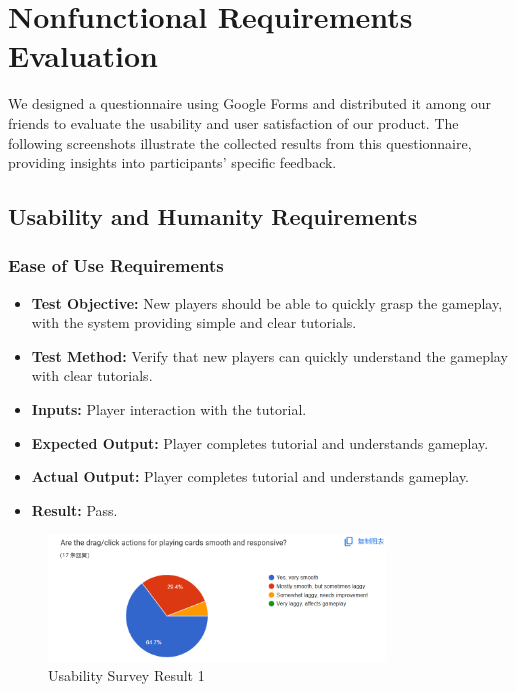 \documentclass[12pt, titlepage]{article}
\begin{document}
\newpage

\section{Nonfunctional Requirements Evaluation}

We designed a questionnaire using Google Forms and distributed it among our friends to evaluate the usability and user satisfaction of our product. The following screenshots illustrate the collected results from this questionnaire, providing insights into participants' specific feedback.

\subsection{Usability and Humanity Requirements}

\subsubsection{Ease of Use Requirements}

\begin{itemize}
    \item \textbf{Test Objective:} New players should be able to quickly grasp the gameplay, with the system providing simple and clear tutorials.
    \item \textbf{Test Method:} Verify that new players can quickly understand the gameplay with clear tutorials.

        \item \textbf{Inputs:} Player interaction with the tutorial.
    \item \textbf{Expected Output:} Player completes tutorial and understands gameplay.
    \item \textbf{Actual Output:} Player completes tutorial and understands gameplay.
    \item \textbf{Result:} Pass.
\end{itemize}

\begin{figure}[h!]
    \centering
    \includegraphics[width=0.8\textwidth]{image3.png}
    \caption{Usability Survey Result 1}
    \label{fig:labelname}
\end{figure}
\end{document}
